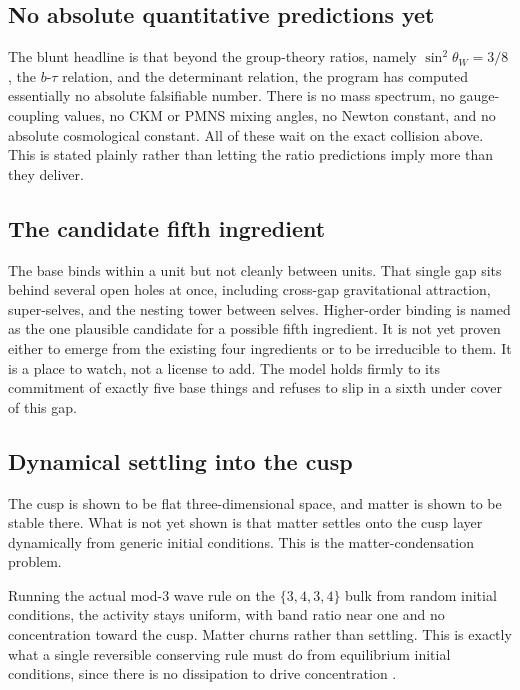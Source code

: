\subsection{No absolute quantitative predictions yet}

The blunt headline is that beyond the group-theory ratios, namely $\sin^2\theta_W = 3/8$, the $b$-$\tau$ relation, and the determinant relation, the program has computed essentially no absolute falsifiable number. There is no mass spectrum, no gauge-coupling values, no CKM or PMNS mixing angles, no Newton constant, and no absolute cosmological constant. All of these wait on the exact collision above. This is stated plainly rather than letting the ratio predictions imply more than they deliver.

\subsection{The candidate fifth ingredient}

The base binds within a unit but not cleanly between units. That single gap sits behind several open holes at once, including cross-gap gravitational attraction, super-selves, and the nesting tower between selves. Higher-order binding is named as the one plausible candidate for a possible fifth ingredient. It is not yet proven either to emerge from the existing four ingredients or to be irreducible to them. It is a place to watch, not a license to add. The model holds firmly to its commitment of exactly five base things and refuses to slip in a sixth under cover of this gap.

\subsection{Dynamical settling into the cusp}

The cusp is shown to be flat three-dimensional space, and matter is shown to be stable there. What is not yet shown is that matter settles onto the cusp layer dynamically from generic initial conditions. This is the matter-condensation problem.

\begin{principle}
Running the actual mod-3 wave rule on the $\{3,4,3,4\}$ bulk from random initial conditions, the activity stays uniform, with band ratio near one and no concentration toward the cusp. Matter churns rather than settling. This is exactly what a single reversible conserving rule must do from equilibrium initial conditions, since there is no dissipation to drive concentration \cite{pollard2026vibetest}.
\end{principle}

